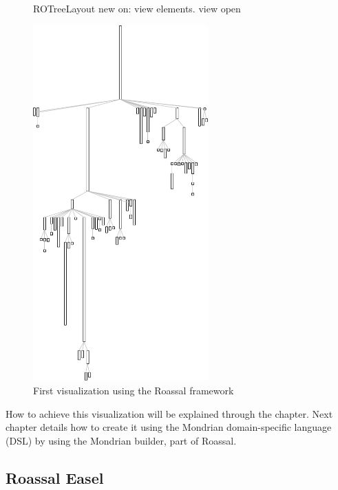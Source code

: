 \documentclass[a4paper,10pt,twoside]{book}
\begin{document}
\begin{figure}[H]
\begin{minipage}[t]{0.5\textwidth}
\begin{code}{}
ROTreeLayout new on: view elements.
view open
\end{code}
   \end{minipage}
   \hfill
   \begin{minipage}[t]{0.6\textwidth}
      \vspace{0pt} \raggedright
       \centering
		\includegraphics[width=0.6\textwidth]{collectionHierarchy}
   \end{minipage}
\label{fig:firstVisualization}
\caption{First visualization using the Roassal framework}
\end{figure}

How to achieve this visualization will be explained through the chapter. 
Next chapter details how to create it using the Mondrian domain-specific language (DSL) by using the Mondrian builder, part of Roassal.

\subsection{Roassal Easel}
\end{document}
